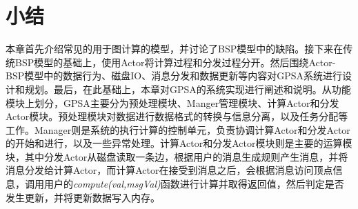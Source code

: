 \section{小结}

本章首先介绍常见的用于图计算的模型，并讨论了BSP模型中的缺陷。接下来在传统BSP模型的基础上，使用Actor将计算过程和分发过程分开。然后围绕Actor-BSP模型中的数据行为、磁盘IO、消息分发和数据更新等内容对GPSA系统进行设计和规划。最后，在此基础上，本章对GPSA的系统实现进行阐述和说明。从功能模块上划分，GPSA主要分为预处理模块、Manger管理模块、计算Actor和分发Actor模块。预处理模块对数据进行数据格式的转换与信息分离，以及任务分配等工作。Manager则是系统的执行计算的控制单元，负责协调计算Actor和分发Actor的开始和进行，以及一些异常处理。计算Actor和分发Actor模块则是主要的运算模块，其中分发Actor从磁盘读取一条边，根据用户的消息生成规则产生消息，并将消息分发给计算Actor，而计算Actor在接受到消息之后，会根据消息访问顶点信息，调用用户的\textit{compute(val,msgVal)}函数进行计算并取得返回值，然后判定是否发生更新，并将更新数据写入内存。
